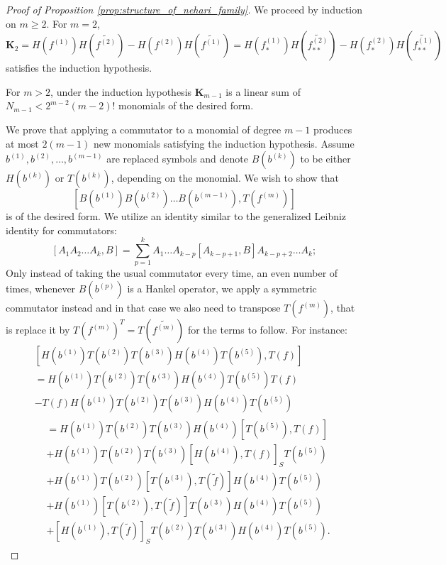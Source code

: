 \documentclass[11pt]{amsart}
\theoremstyle{plain}
\theoremstyle{remark}
\numberwithin{equation}{section}
\begin{document}
\begin{proof}[Proof of Proposition \ref{prop:structure_of_nehari_family}]
We proceed by induction on $m\geq 2$. 
%
%
%
For $m=2$,
$$\mathbf{K}_2= H(f^{(1)})H(\widetilde{f^{(2)}})- H(f^{(2)})H(\widetilde{f^{(1)}})=H(f^{(1)}_{*})H(\widetilde{f^{(2)}_{**}})- H(f^{(2)}_{*})H(\widetilde{f^{(1)}_{**}})$$
satisfies the induction hypothesis.
\medskip

%
%
%
For $m>2$, under the induction hypothesis
$\mathbf{K}_{m-1}$ is a linear sum of $N_{m-1}<2^{m-2}(m-2)!$ monomials of the desired form.

We prove that applying a commutator to a monomial of degree $m-1$ produces at most $2(m-1)$ new monomials satisfying the induction hypothesis. 
Assume $b^{(1)}, b^{(2)}, \ldots, b^{(m-1)}$ are replaced symbols and denote $B(b^{(k)})$ to be either $H(b^{(k)})$ or $T(b^{(k)})$, depending on the monomial. We wish to show that
$$[B(b^{(1)})B(b^{(2)})\ldots B(b^{(m-1)}), T(f^{(m)})]$$
is of the desired form. We utilize an identity similar to the generalized Leibniz identity for commutators:
$$
[A_1A_2\ldots A_k, B]=\sum_{p=1}^{k}A_1\ldots A_{k-p}[A_{k-p+1},B]A_{k-p+2}\ldots A_k;
$$
 Only instead of taking the usual commutator every time, an even number of times, whenever $B(b^{(p)})$ is a Hankel operator, we apply a symmetric commutator instead and in that case we also need to transpose $T(f^{(m)})$, that is replace it by $T(f^{(m)})^T=T(\widetilde{f^{(m)}})$ for the terms to follow.
 For instance:
\begin{multline}\label{eqn:twisted_example}
[H(b^{(1)})T(b^{(2)})T(b^{(3)})H(b^{(4)})T(b^{(5)}), T(f)]
\\=H(b^{(1)})T(b^{(2)})T(b^{(3)})H(b^{(4)})T(b^{(5)})
T(f)
\\-
T(f)
H(b^{(1)})T(b^{(2)})T(b^{(3)})H(b^{(4)})T(b^{(5)})
\\\begin{aligned}
&= H(b^{(1)})T(b^{(2)})T(b^{(3)})H(b^{(4)})[T(b^{(5)}), T(f)]
\\&+ H(b^{(1)})T(b^{(2)})T(b^{(3)})[H(b^{(4)}), T(f)]_S T(b^{(5)})
\\&+H(b^{(1)})T(b^{(2)})[T(b^{(3)}), T(\widetilde{f})]H(b^{(4)})T(b^{(5)})
\\&+H(b^{(1)})[T(b^{(2)}), T(\widetilde{f})]T(b^{(3)})H(b^{(4)})T(b^{(5)})
\\&+[H(b^{(1)}), T(\widetilde{f})]_ST(b^{(2)})T(b^{(3)})H(b^{(4)})T(b^{(5)}).
\end{aligned}
\end{multline}



\end{proof}
\end{document}

